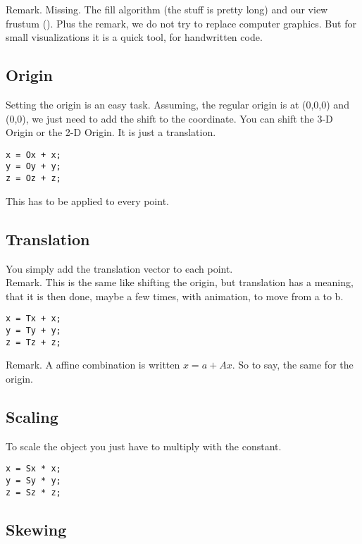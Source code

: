 \documentclass[a4paper]{article}
\begin{document}
\begin{PropositionOpt4}
Remark. Missing. The fill algorithm (the stuff is pretty long) and our view frustum (). Plus the remark, we do not try to replace computer graphics. But for small visualizations it is a quick tool, for handwritten code.\\

\subsection{Origin}  

Setting the origin is an easy task. Assuming, the regular origin is at (0,0,0) and (0,0), we just need to add the shift to the coordinate. You can shift the 3-D Origin or the 2-D Origin.  It is just a translation.\\

\begin{lstlisting}
x = Ox + x;
y = Oy + y;
z = Oz + z;
\end{lstlisting}

This has to be applied to every point.

\subsection{Translation}

You simply add the translation vector to each point.\\

Remark. This is the same like shifting the origin, but translation has a meaning, that it is then done, maybe a few times, with animation, to move from a to b.

\begin{lstlisting}
x = Tx + x;
y = Ty + y;
z = Tz + z;
\end{lstlisting}

Remark. A affine combination is written $x = a + Ax$. So to say, the same for the origin.

\subsection{Scaling}

To scale the object you just have to multiply with the constant. 

\begin{lstlisting}
x = Sx * x;
y = Sy * y;
z = Sz * z;
\end{lstlisting}


\subsection{Skewing}


\end{PropositionOpt4}
\end{document}
